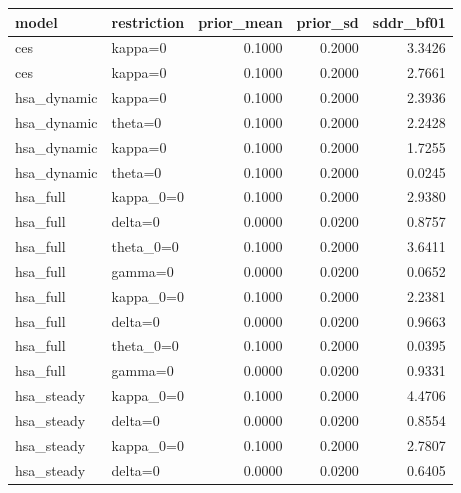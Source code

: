 \begin{tabular}{llrrr}
\toprule
model & restriction & prior\_mean & prior\_sd & sddr\_bf01 \\
\midrule
ces & kappa=0 & 0.1000 & 0.2000 & 3.3426 \\
ces & kappa=0 & 0.1000 & 0.2000 & 2.7661 \\
hsa\_dynamic & kappa=0 & 0.1000 & 0.2000 & 2.3936 \\
hsa\_dynamic & theta=0 & 0.1000 & 0.2000 & 2.2428 \\
hsa\_dynamic & kappa=0 & 0.1000 & 0.2000 & 1.7255 \\
hsa\_dynamic & theta=0 & 0.1000 & 0.2000 & 0.0245 \\
hsa\_full & kappa\_0=0 & 0.1000 & 0.2000 & 2.9380 \\
hsa\_full & delta=0 & 0.0000 & 0.0200 & 0.8757 \\
hsa\_full & theta\_0=0 & 0.1000 & 0.2000 & 3.6411 \\
hsa\_full & gamma=0 & 0.0000 & 0.0200 & 0.0652 \\
hsa\_full & kappa\_0=0 & 0.1000 & 0.2000 & 2.2381 \\
hsa\_full & delta=0 & 0.0000 & 0.0200 & 0.9663 \\
hsa\_full & theta\_0=0 & 0.1000 & 0.2000 & 0.0395 \\
hsa\_full & gamma=0 & 0.0000 & 0.0200 & 0.9331 \\
hsa\_steady & kappa\_0=0 & 0.1000 & 0.2000 & 4.4706 \\
hsa\_steady & delta=0 & 0.0000 & 0.0200 & 0.8554 \\
hsa\_steady & kappa\_0=0 & 0.1000 & 0.2000 & 2.7807 \\
hsa\_steady & delta=0 & 0.0000 & 0.0200 & 0.6405 \\
\bottomrule
\end{tabular}
